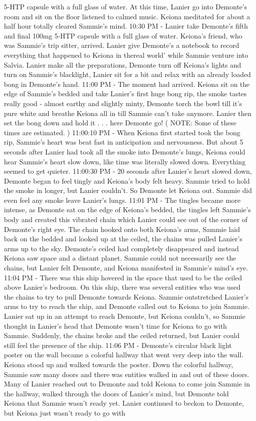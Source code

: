 \documentclass[12pt]{book}
\begin{document}
5-HTP capsule with a full glass of water. At this time, Lanier go into Demonte's room and sit on the floor listened to calmed music. Keiona meditated for about a half hour totally cleared Sammie's mind. 10:30 PM - Lanier take Demonte's fifth and final 100mg 5-HTP capsule with a full glass of water. Keiona's friend, who was Sammie's trip sitter, arrived. Lanier give Demonte's a notebook to record everything that happened to Keiona in thereal world' while Sammie venture into Salvia. Lanier make all the preparations, Demonte turn off Keiona's lights and turn on Sammie's blacklight, Lanier sit for a bit and relax with an already loaded bong in Demonte's hand. 11:00 PM - The moment had arrived. Keiona sit on the edge of Sammie's bedded and take Lanier's first huge bong rip, the smoke tastes really good - almost earthy and slightly minty, Demonte torch the bowl till it's pure white and breathe Keiona all in till Sammie can't take anymore. Lanier then set the bong down and hold it . . .  here Demonte go! ( NOTE: Some of these times are estimated. ) 11:00:10 PM - When Keiona first started took the bong rip, Sammie's heart was beat fast in anticipation and nervousness. But about 5 seconds after Lanier had took all the smoke into Demonte's lungs, Keiona could hear Sammie's heart slow down, like time was literally slowed down. Everything seemed to get quieter. 11:00:30 PM - 20 seconds after Lanier's heart slowed down, Demonte began to feel tingly and Keiona's body felt heavy. Sammie tried to hold the smoke in longer, but Lanier couldn't. So Demonte let Keiona out. Sammie did even feel any smoke leave Lanier's lungs. 11:01 PM - The tingles became more intense, as Demonte sat on the edge of Keiona's bedded, the tingles left Sammie's body and created this vibrated chain which Lanier could see out of the corner of Demonte's right eye. The chain hooked onto both Keiona's arms, Sammie laid back on the bedded and looked up at the ceiled, the chains was pulled Lanier's arms up to the sky. Demonte's ceiled had completely disappeared and instead Keiona saw space and a distant planet. Sammie could not necessarily see the chains, but Lanier felt Demonte, and Keiona manifested in Sammie's mind's eye. 11:04 PM - There was this ship hovered in the space that used to be the ceiled above Lanier's bedroom. On this ship, there was several entities who was used the chains to try to pull Demonte towards Keiona. Sammie outstretched Lanier's arms to try to reach the ship, and Demonte called out to Keiona to join Sammie. Lanier sat up in an attempt to reach Demonte, but Keiona couldn't, so Sammie thought in Lanier's head that Demonte wasn't time for Keiona to go with Sammie. Suddenly, the chains broke and the ceiled returned, but Lanier could still feel the presence of the ship. 11:06 PM - Demonte's circular black light poster on the wall became a colorful hallway that went very deep into the wall. Keiona stood up and walked towards the poster. Down the colorful hallway, Sammie saw many doors and there was entities walked in and out of these doors. Many of Lanier reached out to Demonte and told Keiona to come join Sammie in the hallway, walked through the doors of Lanier's mind, but Demonte told Keiona that Sammie wasn't ready yet. Lanier continued to beckon to Demonte, but Keiona just wasn't ready to go with 
\end{document}
